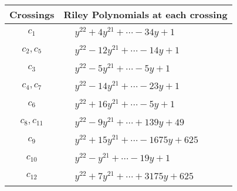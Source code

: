 \documentclass[1p]{elsarticle_modified}
\theoremstyle{definition}
\begin{document}
\begin{tabular}{m{50pt}|m{274pt}}
Crossings & \hspace{64pt}Riley Polynomials at each crossing \\
\hline $$\begin{aligned}c_{1}\end{aligned}$$&$\begin{aligned}
&y^{22}+4 y^{21}+\cdots-34 y+1
\end{aligned}$\\
\hline $$\begin{aligned}c_{2},c_{5}\end{aligned}$$&$\begin{aligned}
&y^{22}-12 y^{21}+\cdots-14 y+1
\end{aligned}$\\
\hline $$\begin{aligned}c_{3}\end{aligned}$$&$\begin{aligned}
&y^{22}-5 y^{21}+\cdots-5 y+1
\end{aligned}$\\
\hline $$\begin{aligned}c_{4},c_{7}\end{aligned}$$&$\begin{aligned}
&y^{22}-14 y^{21}+\cdots-23 y+1
\end{aligned}$\\
\hline $$\begin{aligned}c_{6}\end{aligned}$$&$\begin{aligned}
&y^{22}+16 y^{21}+\cdots-5 y+1
\end{aligned}$\\
\hline $$\begin{aligned}c_{8},c_{11}\end{aligned}$$&$\begin{aligned}
&y^{22}-9 y^{21}+\cdots+139 y+49
\end{aligned}$\\
\hline $$\begin{aligned}c_{9}\end{aligned}$$&$\begin{aligned}
&y^{22}+15 y^{21}+\cdots-1675 y+625
\end{aligned}$\\
\hline $$\begin{aligned}c_{10}\end{aligned}$$&$\begin{aligned}
&y^{22}- y^{21}+\cdots-19 y+1
\end{aligned}$\\
\hline $$\begin{aligned}c_{12}\end{aligned}$$&$\begin{aligned}
&y^{22}+7 y^{21}+\cdots+3175 y+625
\end{aligned}$\\
\hline
\end{tabular}\\~\\
\end{document}
